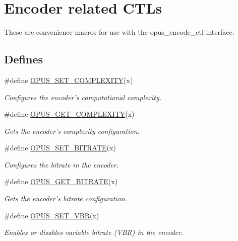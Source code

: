 \hypertarget{group__opus__encoderctls}{
\section{Encoder related CTLs}
\label{group__opus__encoderctls}
}


These are convenience macros for use with the {\ttfamily opus\_\-encode\_\-ctl} interface.  
\subsection*{Defines}
\begin{DoxyCompactItemize}
\item 
\#define \hyperlink{group__opus__encoderctls_ga3483877bf1687a75dd4a1de6f85f291c}{OPUS\_\-SET\_\-COMPLEXITY}(x)
\begin{DoxyCompactList}\small\item\em Configures the encoder's computational complexity. \item\end{DoxyCompactList}\item 
\#define \hyperlink{group__opus__encoderctls_ga89755ee721a38d964c7630a920eb27d2}{OPUS\_\-GET\_\-COMPLEXITY}(x)
\begin{DoxyCompactList}\small\item\em Gets the encoder's complexity configuration. \item\end{DoxyCompactList}\item 
\#define \hyperlink{group__opus__encoderctls_ga0bb51947e355b33d0cb358463b5101a7}{OPUS\_\-SET\_\-BITRATE}(x)
\begin{DoxyCompactList}\small\item\em Configures the bitrate in the encoder. \item\end{DoxyCompactList}\item 
\#define \hyperlink{group__opus__encoderctls_ga1427a5560cbc7e9a59f986d89c05082c}{OPUS\_\-GET\_\-BITRATE}(x)
\begin{DoxyCompactList}\small\item\em Gets the encoder's bitrate configuration. \item\end{DoxyCompactList}\item 
\#define \hyperlink{group__opus__encoderctls_ga34d09ae06cab7e1a6c49876249b67892}{OPUS\_\-SET\_\-VBR}(x)
\begin{DoxyCompactList}\small\item\em Enables or disables variable bitrate (VBR) in the encoder. \item\end{DoxyCompactList}\item 

\end{DoxyCompactItemize}
